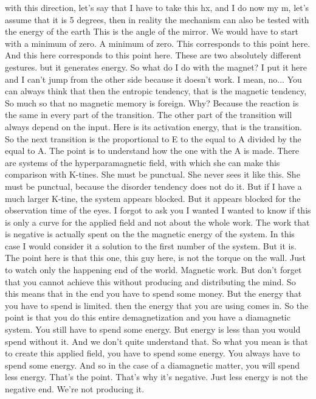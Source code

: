 with this direction, let's say that I have to take this hx, and I do now my m, let's assume that it is 5 degrees, then in reality the mechanism can also be tested with the energy of the earth This is the angle of the mirror. We would have to start with a minimum of zero. A minimum of zero. This corresponds to this point here. And this here corresponds to this point here. These are two absolutely different gestures. but it generates energy. So what do I do with the magnet? I put it here and I can't jump from the other side because it doesn't work. I mean, no... You can always think that then the entropic tendency, that is the magnetic tendency, So much so that no magnetic memory is foreign. Why? Because the reaction is the same in every part of the transition. The other part of the transition will always depend on the input. Here is its activation energy, that is the transition. So the next transition is the proportional to E to the equal to A divided by the equal to A. The point is to understand how the one with the A is made. There are systems of the hyperparamagnetic field, with which she can make this comparison with K-tines. She must be punctual. She never sees it like this. She must be punctual, because the disorder tendency does not do it. But if I have a much larger K-tine, the system appears blocked. But it appears blocked for the observation time of the eyes. I forgot to ask you I wanted I wanted to know if this is only a curve for the applied field and not about the whole work. The work that is negative is actually spent on the the magnetic energy of the system. In this case I would consider it a solution to the first number of the system. But it is. The point here is that this one, this guy here, is not the torque on the wall. Just to watch only the happening end of the world. Magnetic work. But don't forget that you cannot achieve this without producing and distributing the mind. So this means that in the end you have to spend some money. But the energy that you have to spend is limited. then the energy that you are using comes in. So the point is that you do this entire demagnetization and you have a diamagnetic system. You still have to spend some energy. But energy is less than you would spend without it. And we don't quite understand that. So what you mean is that to create this applied field, you have to spend some energy. You always have to spend some energy. And so in the case of a diamagnetic matter, you will spend less energy. That's the point. That's why it's negative. Just less energy is not the negative end. We're not producing it.


